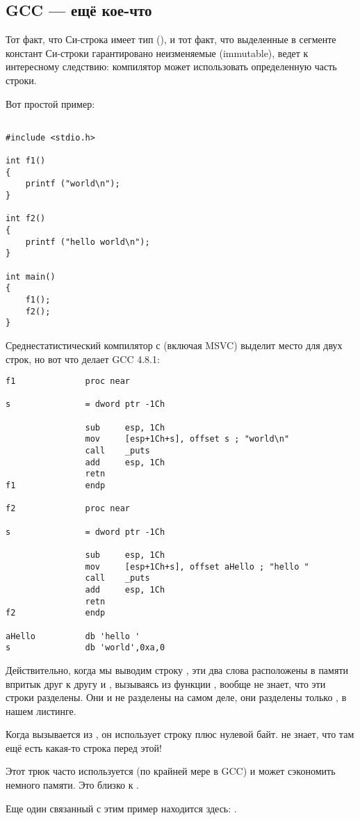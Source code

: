 \subsection{GCC --- ещё кое-что}
\label{use_parts_of_C_strings}

Тот факт, что  Си-строка имеет тип  (), 
и тот факт, что выделенные в сегменте констант Си-строки гарантировано неизменяемые (immutable), 
ведет к интересному следствию: компилятор может использовать определенную часть строки.

Вот простой пример:

\begin{lstlisting}[style=customc]

#include <stdio.h>

int f1()
{
	printf ("world\n");
}

int f2()
{
	printf ("hello world\n");
}

int main()
{
	f1();
	f2();
}
\end{lstlisting}

Среднестатистический компилятор с \CCpp (включая MSVC) выделит место для двух строк, но вот что делает GCC 4.8.1:

\begin{lstlisting}[caption=GCC 4.8.1 + листинг в IDA,style=customasmx86]
f1              proc near

s               = dword ptr -1Ch

                sub     esp, 1Ch
                mov     [esp+1Ch+s], offset s ; "world\n"
                call    _puts
                add     esp, 1Ch
                retn
f1              endp

f2              proc near

s               = dword ptr -1Ch

                sub     esp, 1Ch
                mov     [esp+1Ch+s], offset aHello ; "hello "
                call    _puts
                add     esp, 1Ch
                retn
f2              endp

aHello          db 'hello '
s               db 'world',0xa,0
\end{lstlisting}

Действительно, когда мы выводим строку , 
эти два слова расположены в памяти впритык друг к другу и \puts, вызываясь из функции , вообще не знает,
что эти строки разделены. Они и не разделены на самом деле, они разделены
только , в нашем листинге.

Когда \puts вызывается из , он использует строку  плюс нулевой байт. \puts не знает, что там ещё есть какая-то строка перед этой!

Этот трюк часто используется (по крайней мере в GCC) и может сэкономить немного памяти.
Это близко к .

Еще один связанный с этим пример находится здесь: .

